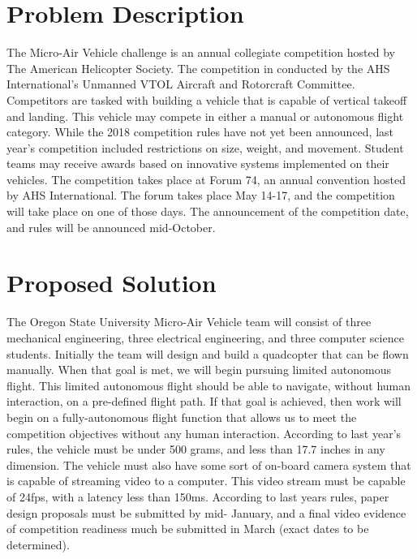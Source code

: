 \documentclass[letterpaper,10pt,titlepage]{article}
\begin{document}
\section*{Problem Description}\par
\hspace{4ex}The Micro-Air Vehicle challenge is an annual collegiate competition
hosted by The American Helicopter Society. The competition in conducted by the 
AHS International's Unmanned VTOL Aircraft and Rotorcraft Committee. Competitors 
are tasked with building a vehicle that is capable of vertical takeoff and 
landing. This vehicle may compete in either a manual or autonomous flight 
category. While the 2018 competition rules have not yet been announced, last 
year's competition included restrictions on size, weight, and movement. Student 
teams may receive awards based on innovative systems implemented on their 
vehicles. The competition takes place at Forum 74, an annual convention hosted 
by AHS International. The forum takes place May 14-17, and the competition will 
take place on one of those days. The announcement of the competition date, and 
rules will be announced mid-October. 

\section*{Proposed Solution}\par
\hspace{4ex}The Oregon State University Micro-Air Vehicle team will consist of 
three mechanical engineering, three electrical engineering, and three computer 
science students. Initially the team will design and build a quadcopter that 
can be flown manually. When that goal is met, we will begin pursuing limited
autonomous flight. This limited autonomous flight should be able to navigate, 
without human interaction, on a pre-defined flight path. If that goal is 
achieved, then work will begin on a fully-autonomous flight function that 
allows us to meet the competition objectives without any human interaction. 
According to last year's rules, the vehicle must be under 500 grams, and less 
than 17.7 inches in any dimension. The vehicle must also have some sort of 
on-board camera system that is capable of streaming video to a computer. This 
video stream must be capable of 24fps, with a latency less than 150ms. 
According to last years rules, paper design proposals must be submitted by mid-
January, and a final video evidence of competition readiness much be submitted 
in March (exact dates to be determined).
\end{document}
